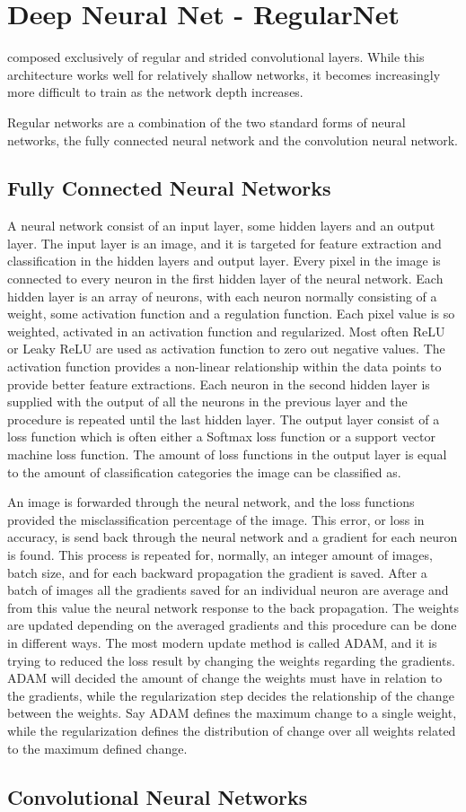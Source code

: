 \section{Deep Neural Net - RegularNet}
composed exclusively of regular and strided convolutional layers. While this architecture works well for relatively shallow networks, it becomes increasingly more difficult to train as the network depth increases.

Regular networks are a combination of the two standard forms of neural networks, the fully connected neural network and the convolution neural network.

\subsection{Fully Connected Neural Networks}
A neural network consist of an input layer, some hidden layers and an output layer. The input layer is an image, and it is targeted for feature extraction and classification in the hidden layers and output layer. Every pixel in the image is connected to every neuron in the first hidden layer of the neural network.    
Each hidden layer is an array of neurons, with each neuron normally consisting of a weight, some activation function and a regulation function. Each pixel value is so weighted, activated in an activation function and regularized. Most often ReLU or Leaky ReLU are used as activation function to zero out negative values. The activation function provides a non-linear relationship within the data points to provide better feature extractions. Each neuron in the second hidden layer is supplied with the output of all the neurons in the previous layer and the procedure is repeated until the last hidden layer. The output layer consist of a loss function which is often either a Softmax loss function or a support vector machine loss function. The amount of loss functions in the output layer is equal to the amount of classification categories the image can be classified as.

An image is forwarded through the neural network, and the loss functions provided the misclassification percentage of the image. This error, or loss in accuracy, is send back through the neural network and a gradient for each neuron is found. This process is repeated for, normally, an integer amount of images, batch size, and for each backward propagation the gradient is saved. After a batch of images all the gradients saved for an individual neuron are average and from this value the neural network response to the back propagation. The weights are updated depending on the averaged gradients and this procedure can be done in different ways. The most modern update method is called ADAM, and it is trying to reduced the loss result by changing the weights regarding the gradients. ADAM will decided the amount of change the weights must have in relation to the gradients, while the regularization step decides the relationship of the change between the weights. Say ADAM defines the maximum change to a single weight, while the regularization defines the distribution of change over all weights related to the maximum defined change.

\FloatBarrier

\subsection{Convolutional Neural Networks}


